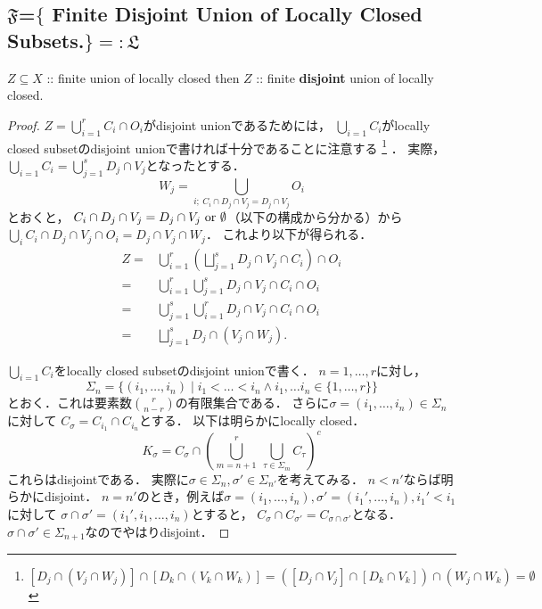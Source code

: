 \documentclass[a4paper]{jsarticle}
\begin{document}
    \subsection{$\mathfrak{F}$=$\{$ Finite Disjoint Union of Locally Closed Subsets.$\}=:\mathfrak{L}$}

    \begin{Lemma}
        $Z \subseteq X$ :: finite union of locally closed
        then
        $Z$ :: finite \textbf{disjoint} union of locally closed.
    \end{Lemma}
    \begin{proof}
        $Z=\bigcup_{i=1}^r C_i \cap O_i$がdisjoint unionであるためには，
        $\bigcup_{i=1} C_i$がlocally closed subsetのdisjoint unionで書ければ十分であることに注意する
        \footnote
        {
        $[D_j \cap (V_j \cap W_j)] \cap [D_k \cap (V_k \cap W_k)]=([D_j \cap V_j] \cap [D_k \cap V_k]) \cap (W_j \cap W_k)=\emptyset$
        }
        ．
        実際，$\bigcup_{i=1} C_i=\bigcup_{j=1}^s D_j \cap V_j$となったとする．
        \[ W_j=\bigcup_{i;~ C_i \cap D_j \cap V_j=D_j \cap V_j} O_i \]
        とおくと，
        $C_i \cap D_j \cap V_j=D_j \cap V_j \text{ or } \emptyset$（以下の構成から分かる）から
        $\bigcup_i C_i \cap D_j \cap V_j \cap O_i=D_j \cap V_j \cap W_j$．
        これより以下が得られる．
        \begin{align*}
            Z 
            =&  \bigcup_{i=1}^r \left(\bigsqcup_{j=1}^s D_j \cap V_j \cap C_i \right) \cap O_i \\
            =&  \bigcup_{i=1}^r \bigcup_{j=1}^s D_j \cap V_j \cap C_i \cap O_i \\
            =&  \bigcup_{j=1}^s \bigcup_{i=1}^r D_j \cap V_j \cap C_i \cap O_i \\
            =&  \bigsqcup_{j=1}^s D_j \cap (V_j \cap W_j).
        \end{align*}

        $\bigcup_{i=1} C_i$をlocally closed subsetのdisjoint unionで書く．
        $n=1,\dots,r$に対し，
        \[ \Sigma_n=\{ (i_1,\dots,i_n) \mid i_1<\dots<i_n \land i_1,\dots i_n \in \{1,\dots,r\} \} \]
        とおく．これは要素数$\binom{r}{n-r}$の有限集合である．
        さらに$\sigma=(i_1,\dots,i_n) \in \Sigma_n$に対して
        $C_{\sigma}=C_{i_1} \cap C_{i_n}$とする．
        以下は明らかにlocally closed．
        \[ K_{\sigma}=C_{\sigma} \cap \left( \bigcup_{m=n+1}^r ~\bigcup_{\tau \in \Sigma_m} C_{\tau} \right)^c \]
        これらはdisjointである．
        実際に$\sigma \in \Sigma_{n}, \sigma' \in \Sigma_{n'}$を考えてみる．
        $n < n'$ならば明らかにdisjoint．
        $n=n'$のとき，例えば$\sigma=(i_1,\dots,i_n),\sigma'=(i_1',\dots,i_n), i_1'<i_1$に対して
        $\sigma \cap \sigma'=(i_1',i_1,\dots,i_n)$とすると，
        $C_{\sigma} \cap C_{\sigma'}=C_{\sigma \cap \sigma'}$となる．
        $\sigma \cap \sigma' \in \Sigma_{n+1}$なのでやはりdisjoint．
    \end{proof}
\end{document}
